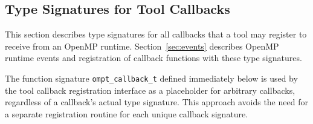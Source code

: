 \documentclass{article}
\begin{document}
\subsection{Type Signatures for Tool Callbacks}
\label{appendix:ompt-types:callbacks}
This section describes type signatures for all  callbacks that a tool may register to receive from an OpenMP runtime. Section~\ref{sec:events} describes OpenMP runtime events and registration of
callback functions with these type signatures.

The function signature  \verb|ompt_callback_t| defined immediately below is used by the tool callback registration interface as a placeholder for arbitrary callbacks,
 regardless of a callback's actual type signature. This approach avoids the need for a separate registration routine for each unique callback signature. 
\end{document}
